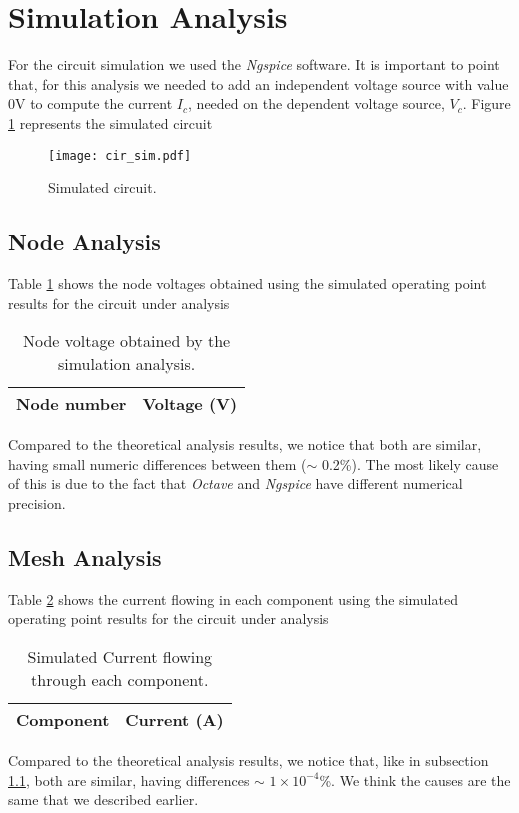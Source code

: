 \section{Simulation Analysis}
\label{sec:simulation}

For the circuit simulation we used the \textit{Ngspice} software. It is important to point that, for this analysis we needed to add an independent voltage source with value 0V to compute the current $I_c$, needed on the dependent voltage source, $V_c$. Figure \ref{fig:cir_sim} represents the simulated circuit

\begin{figure}[H] \centering
\texttt{[image: cir\_sim.pdf]}
\caption{Simulated circuit.}
\label{fig:cir_sim}
\end{figure}

\subsection{Node Analysis}
\label{subsec:node_sim}

Table \ref{tab:node_sim} shows the node voltages obtained using the simulated operating point results for the circuit under analysis
\begin{table}[H]
  \centering
  \begin{tabular}{|l|r|}
    \hline    
    {\bf Node number} & {\bf Voltage (V)} \\ \hline
    
  \end{tabular}
  \caption{Node voltage obtained by the simulation analysis.}
  \label{tab:node_sim}
\end{table}
Compared to the theoretical analysis results, we notice that both are similar, having small numeric differences between them ($\sim$ 0.2\%). The most likely cause of this is due to the fact that \textit{Octave} and \textit{Ngspice} have different numerical precision.

\subsection{Mesh Analysis}

Table \ref{tab:mesh_sim} shows the current flowing in each component using the simulated operating point results for the circuit under analysis
\begin{table}[H]
  \centering
  \begin{tabular}{|l|r|}
    \hline    
    {\bf Component} & {\bf Current (A)} \\ \hline
    
  \end{tabular}
  \caption{Simulated Current flowing through each component.}
  \label{tab:mesh_sim}
\end{table}

Compared to the theoretical analysis results, we notice that, like in subsection \ref{subsec:node_sim}, both are similar, having differences $\sim$ $1\times10^{-4}$\%. We think the causes are the same that we described earlier.


